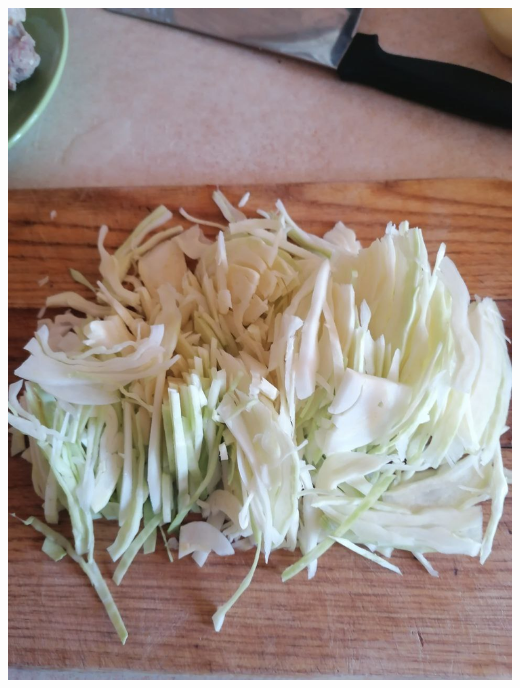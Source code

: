 \documentclass[11pt,a4paper]{article}
\begin{document}
\includegraphics[width=\textwidth]{6.jpg} \\
\end{document}
